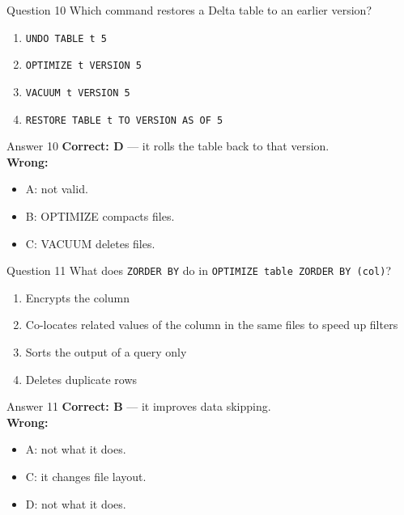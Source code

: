 \documentclass[aspectratio=169,11pt]{beamer}
\begin{document}
\begin{frame}{Question 10}
Which command restores a Delta table to an earlier version?
\begin{enumerate}[label=\Alph*.]
\item \texttt{UNDO TABLE t 5}
\item \texttt{OPTIMIZE t VERSION 5}
\item \texttt{VACUUM t VERSION 5}
\item \texttt{RESTORE TABLE t TO VERSION AS OF 5}
\end{enumerate}
\end{frame}
\begin{frame}{Answer 10}
\textbf{Correct: D} --- it rolls the table back to that version.\\
\vspace{0.5em}
\textbf{Wrong:}
\begin{itemize}
\item A: not valid.
\item B: OPTIMIZE compacts files.
\item C: VACUUM deletes files.
\end{itemize}
\end{frame}

\begin{frame}{Question 11}
What does \texttt{ZORDER BY} do in \texttt{OPTIMIZE table ZORDER BY (col)}?
\begin{enumerate}[label=\Alph*.]
\item Encrypts the column
\item Co-locates related values of the column in the same files to speed up filters
\item Sorts the output of a query only
\item Deletes duplicate rows
\end{enumerate}
\end{frame}
\begin{frame}{Answer 11}
\textbf{Correct: B} --- it improves data skipping.\\
\vspace{0.5em}
\textbf{Wrong:}
\begin{itemize}
\item A: not what it does.
\item C: it changes file layout.
\item D: not what it does.
\end{itemize}
\end{frame}
\end{document}
